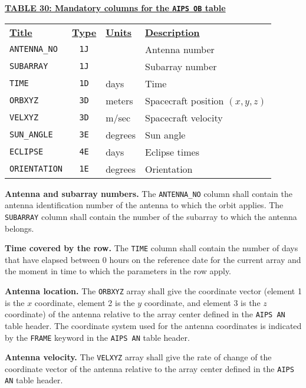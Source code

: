 \documentclass[twoside]{article}
\begin{document}
\begin{center}
\underline{\bf{TABLE 30: Mandatory columns for the {\tt AIPS OB} table}}\\
\begin{tabular}{lcll}
\noalign{\vspace{2pt}} \label{ta:OBcols}
\underline{{\bf Title\vphantom{y}}} & \underline{\bf{Type}} &
   \underline{{\bf Units\vphantom{y}}} & \underline{\bf{Description}} \\
\noalign{\vspace{2pt}}
{\tt ANTENNA\_NO} & {\tt 1J} &         & Antenna number \\
{\tt SUBARRAY}    & {\tt 1J} &         & Subarray number \\
{\tt TIME}        & {\tt 1D} & days    & Time \\
{\tt ORBXYZ}      & {\tt 3D} & meters  & Spacecraft position $(x,y,z)$ \\
{\tt VELXYZ}      & {\tt 3D} & m/sec   & Spacecraft velocity \\
{\tt SUN\_ANGLE}  & {\tt 3E} & degrees & Sun angle \\
{\tt ECLIPSE}     & {\tt 4E} & days    & Eclipse times \\
{\tt ORIENTATION} & {\tt 1E} & degrees & Orientation
\end{tabular}
\end{center}

{\bf Antenna and subarray numbers.}  The {\tt ANTENNA\_NO} column
shall contain the antenna identification number of the antenna to
which the orbit applies.  The {\tt SUBARRAY} column shall contain the
number of the subarray to which the antenna belongs.

{\bf Time covered by the row.}  The {\tt TIME} column shall contain
the number of days that have elapsed between 0 hours on the reference
date for the current array and the moment in time to which the
parameters in the row apply.

{\bf Antenna location.} The {\tt ORBXYZ} array shall give the
coordinate vector (element 1 is the $x$ coordinate, element 2 is the
$y$ coordinate, and element 3 is the $z$ coordinate) of the antenna
relative to the array center defined in the {\tt AIPS AN} table
header.  The coordinate system used for the antenna coordinates is
indicated by the {\tt FRAME} keyword in the {\tt AIPS AN} table
header.

{\bf Antenna velocity.} The {\tt VELXYZ} array shall give the rate of
change of the coordinate vector of the antenna relative to the array
center defined in the {\tt AIPS AN} table header.
\end{document}
